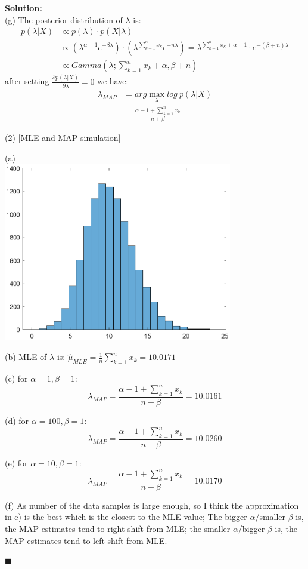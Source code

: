 \documentclass{article}
\newenvironment{solution}                               %
{\textbf{Solution:} \\}{$\blacksquare$\newline}         %
\begin{document}
\begin{solution}
        (g) The posterior distribution of $\lambda$ is:
        \begin{align*}
            p(\lambda | X) &\propto p(\lambda) \cdot p(X|\lambda) \\
            &\propto
                (\lambda^{\alpha -1} e^{-\beta \lambda}) \cdot
                (\lambda^{\sum_{k=1}^{n} x_k} e^{-n\lambda})
             = \lambda^{\sum_{k=1}^{n} x_k + \alpha -1} \cdot e^{-(\beta+n) \lambda} \\
            &\propto Gamma(\lambda;\sum_{k=1}^{n} x_k + \alpha, \beta+n)
        \end{align*}
        after setting $\frac{\partial p(\lambda|X)}{\partial \lambda} = 0$ we have:
        \begin{align*}
            \lambda_{MAP} &= arg\max_{\lambda}log\ p(\lambda | X) \\
            &= \frac{\alpha - 1 + \sum_{k=1}^{n} x_k}{n + \beta}
        \end{align*}

        (2) [MLE and MAP simulation]

        (a) \\
        \includegraphics[width=0.75\textwidth]{images/a1_histo.eps}
        
        (b) MLE of $\lambda$ is: 
        $\hat{\mu}_{MLE} = \frac{1}{n} \sum\limits_{k=1}^{n} x_k = 10.0171$

        (c) for $\alpha=1, \beta=1$:
        $$
        \lambda_{MAP} = \frac{\alpha - 1 + \sum_{k=1}^{n} x_k}{n + \beta} = 10.0161
        $$

        (d) for $\alpha=100, \beta=1$:
        $$
        \lambda_{MAP} = \frac{\alpha - 1 + \sum_{k=1}^{n} x_k}{n + \beta} = 10.0260
        $$

        (e) for $\alpha=10, \beta=1$:
        $$
        \lambda_{MAP} = \frac{\alpha - 1 + \sum_{k=1}^{n} x_k}{n + \beta} = 10.0170
        $$

        (f) As number of the data samples is large enough, so I think the approximation in e) is the best which is the closest to the MLE value; 
        The bigger $\alpha$/smaller $\beta$ is, the MAP estimates tend to right-shift from MLE; the smaller $\alpha$/bigger $\beta$ is, the MAP estimates tend to left-shift from MLE.

    \end{solution}
\end{document}
